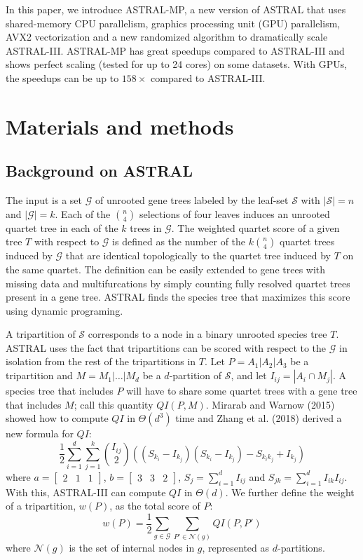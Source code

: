 \documentclass[12pt]{article}
\begin{document}
In this paper, we introduce ASTRAL-MP, a new version of ASTRAL that uses shared-memory CPU parallelism, graphics processing unit (GPU) parallelism, AVX2 vectorization and a new randomized algorithm to dramatically scale ASTRAL-III. ASTRAL-MP has great speedups compared to ASTRAL-III and shows perfect scaling (tested for up to 24 cores) on some datasets. With GPUs, the speedups can be up to $158\times$ compared to ASTRAL-III.

\section{Materials and methods}

\subsection{Background on ASTRAL}
The input is a set $\mathcal{G}$ of unrooted gene trees labeled by the leaf-set $\mathcal{S}$ with $|\mathcal{S}|=n$ and $|\mathcal{G}|=k$. Each of the $\binom{n}{4}$ selections of four leaves induces an unrooted quartet tree in each of the $k$ trees in $\mathcal{G}$. The weighted quartet score of a given tree $T$ with respect to $\mathcal{G}$ is defined as the number of the $k\binom{n}{4}$ quartet trees induced by $\mathcal{G}$ that are identical topologically to the quartet tree induced by $T$ on the same quartet. The definition can be easily extended to gene trees with missing data and multifurcations by simply counting fully resolved quartet trees present in a gene tree. ASTRAL finds the species tree that maximizes this score using dynamic programing.

A tripartition of $\mathcal{S}$ corresponds to a node in a binary unrooted species tree $T$. ASTRAL uses the fact that tripartitions can be scored with respect to the $\mathcal{G}$ in isolation from the rest of the tripartitions in $T$. Let $P=A_1|A_2|A_3$ be a tripartition and $M=M_1|\ldots|M_d$ be a $d$-partition of $\mathcal{S}$, and let $I_{i j}=|A_i \cap M_j|$. A species tree that includes $P$ will have to share some quartet trees with a gene tree that includes $M$; call this quantity $QI(P, M)$. Mirarab and Warnow (2015) showed how to compute $QI$ in $\Theta(d^3)$ time and Zhang et al. (2018) derived a new formula for $QI$:
\begin{equation}
\frac{1}{2} \sum_{i=1}^d \sum_{j=1}^k \binom{I_{i j}}{2} \left( (S_{k_i} - I_{k_j})(S_{k_i} - I_{k_j}) - S_{k_i k_j} + I_{k_j} \right)
\end{equation}
where $a=\begin{bmatrix} 2 & 1 & 1 \end{bmatrix}$, $b=\begin{bmatrix} 3 & 3 & 2 \end{bmatrix}$, $S_j=\sum_{i=1}^d I_{i j}$ and $S_{j k}=\sum_{i=1}^d I_{i k} I_{i j}$. With this, ASTRAL-III can compute $QI$ in $\Theta(d)$. We further define the weight of a tripartition, $w(P)$, as the total score of $P$:
\begin{equation}
w(P) = \frac{1}{2} \sum_{g \in \mathcal{G}} \sum_{P' \in \mathcal{N}(g)} QI(P, P')
\end{equation}
where $\mathcal{N}(g)$ is the set of internal nodes in $g$, represented as $d$-partitions.
\end{document}

